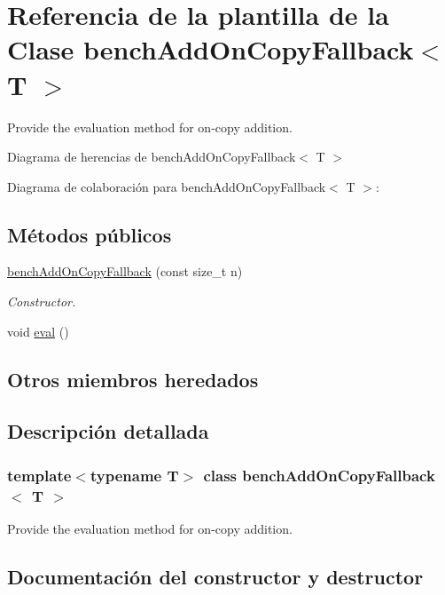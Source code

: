 \hypertarget{classbenchAddOnCopyFallback}{}\section{Referencia de la plantilla de la Clase bench\+Add\+On\+Copy\+Fallback$<$ T $>$}
\label{classbenchAddOnCopyFallback}


Provide the evaluation method for on-\/copy addition.  




Diagrama de herencias de bench\+Add\+On\+Copy\+Fallback$<$ T $>$


Diagrama de colaboración para bench\+Add\+On\+Copy\+Fallback$<$ T $>$\+:
\subsection*{Métodos públicos}
\begin{DoxyCompactItemize}
\item 
\hyperlink{classbenchAddOnCopyFallback_a9beed39858bdecbc045cbbf0ad146203}{bench\+Add\+On\+Copy\+Fallback} (const size\+\_\+t n)
\begin{DoxyCompactList}\small\item\em Constructor. \end{DoxyCompactList}\item 
void \hyperlink{classbenchAddOnCopyFallback_a7b49d3f29f7854698f3867a410af40b8}{eval} ()
\end{DoxyCompactItemize}
\subsection*{Otros miembros heredados}


\subsection{Descripción detallada}
\subsubsection*{template$<$typename T$>$\newline
class bench\+Add\+On\+Copy\+Fallback$<$ T $>$}

Provide the evaluation method for on-\/copy addition. 

\subsection{Documentación del constructor y destructor}
\mbox{\label{classbenchAddOnCopyFallback_a9beed39858bdecbc045cbbf0ad146203}} 
